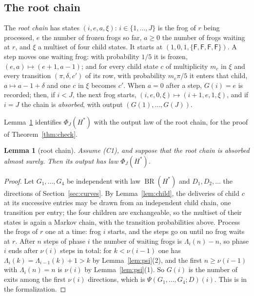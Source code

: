 \documentclass[11pt]{amsart}
\newtheorem{lemma}[theorem]{Lemma}
\theoremstyle{definition}
\numberwithin{equation}{section}
\newcommand{\lean}[1]{\ignorespaces}
\newcommand{\BR}{\operatorname{BR}}
\begin{document}
\subsection{The root chain}
The \emph{root chain} has states $(i,e,a,\xi)$: $i\in\{1,\dots,J\}$ is the frog of $r$ being processed, $e$ the number of frozen frogs so far, $a\ge0$ the number of frogs waiting at $r$, and $\xi$ a multiset of four child states. It starts at $(1,0,1,\{\mathsf F,\mathsf F,\mathsf F,\mathsf F\})$. A step moves one waiting frog: with probability $1/5$ it is frozen, $(e,a)\mapsto(e+1,a-1)$; and for every child state $c$ of multiplicity $m_c$ in $\xi$ and every transition $(\pi,\delta,c')$ of its row, with probability $m_c\pi/5$ it enters that child, $a\mapsto a-1+\delta$ and one $c$ in $\xi$ becomes $c'$. When $a=0$ after a step, $G(i)=e$ is recorded; then, if $i<J$, the next frog starts, $(i,e,0,\xi)\mapsto(i+1,e,1,\xi)$, and if $i=J$ the chain is \emph{absorbed}, with output $(G(1),\dots,G(J))$.

Lemma~\ref{lem:root} identifies $\Phi_J(H^*)$ with the output law of the root chain, for the proof of Theorem~\ref{thm:check}.

\begin{lemma}[root chain]\label{lem:root}\lean{FrogModel.Engine.law_outPsi_start, FrogModel.Engine.outPsi, FrogModel.Engine.rstep}
Assume (C1), and suppose that the root chain is absorbed almost surely. Then its output has law $\Phi_J(H^*)$.
\end{lemma}

\begin{proof}
Let $G_1,\dots,G_4$ be independent with law $\BR(H^*)$ and $D_1,D_2,\dots$ the directions of Section~\ref{sec:curves}. By Lemma~\ref{lem:child}, the deliveries of child $c$ at its successive entries may be drawn from an independent child chain, one transition per entry; the four children are exchangeable, so the multiset of their states is again a Markov chain, with the transition probabilities above. Process the frogs of $r$ one at a time: frog $i$ starts, and the steps go on until no frog waits at $r$. After $n$ steps of phase $i$ the number of waiting frogs is $\Lambda_i(n)-n$, so phase $i$ ends after $\nu(i)$ steps in total: for $k<\nu(i-1)$ one has $\Lambda_i(k)=\Lambda_{i-1}(k)+1>k$ by Lemma~\ref{lem:psi}(2), and the first $n\ge\nu(i-1)$ with $\Lambda_i(n)=n$ is $\nu(i)$ by Lemma~\ref{lem:psi}(1). So $G(i)$ is the number of exits among the first $\nu(i)$ directions, which is $\Psi(G_1,\dots,G_4;D)(i)$. This is  in the formalization.
\end{proof}
\end{document}
